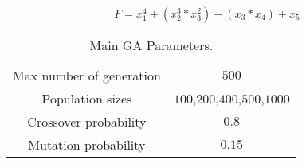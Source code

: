 \begin{equation}
\label{eq:fitness}
 F=x_{1}^{4} + (x_{2}^{3} * x_{3}^{2}) - (x_{3} * x_{4}) + x_{5} 
\end{equation}


\begin{table}
\renewcommand{\arraystretch}{1.3}
\centering
\caption{Main GA Parameters.}
\label{Table:par_genetico}
\begin{tabular}{cc}
\hline
Max number of generation & $500$ \\
Population sizes & $100$,$200$,$400$,$500$,$1000$ \\
Crossover probability & $0.8$ \\ 
Mutation probability & $0.15$ \\ 
\hline
\end{tabular}
\end{table} 